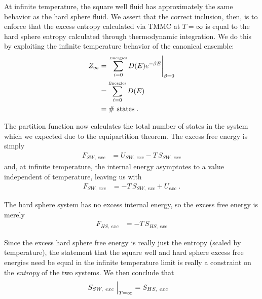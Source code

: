 \documentclass[12pt]{article}
\begin{document}
At infinite temperature, the square well fluid has approximately the same behavior as the hard sphere fluid.  We assert that the correct inclusion, then, is to enforce that the excess entropy calculated via TMMC at $T=\infty$ is equal to the hard sphere entropy calculated through thermodynamic integration. We do this by exploiting the infinite temperature behavior of the canonical ensemble:
\begin{align}
    Z_{\infty} &= \left.\sum_{i=0}^{\text{\tiny Energies}} D(E) e^{-\beta E}\right|_{\beta = 0}\\
    &= \sum_{i=0}^{\text{\tiny Energies}} D(E)\\
    &= \#\text{~states}\;.
\end{align}

The partition function now calculates the total number of states in the system which we expected due to the equipartition theorem. The excess free energy is simply
\begin{align}
    F_{SW,~exc} &= U_{SW,~exc} - T\,S_{SW,~exc}     
\end{align} 
and, at infinite temperature, the internal energy asymptotes to a value independent of temperature, leaving us with
\begin{align}
    F_{SW,~exc} &= -T\,S_{SW, ~exc} + U_{exc}\;.
\end{align}

The hard sphere system has no excess internal energy, so the excess free energy is merely
\begin{align}
     F_{HS,~exc} &= -T\,S_{HS,~exc} 
\end{align} 

Since the excess hard sphere free energy is really just the entropy \cite{valeskethesis} (scaled by temperature), the statement that the square well and hard sphere excess free energies need be equal in the infinite temperature limit is really a constraint on the {\it entropy} of the two systems. We then conclude that
\begin{align}
    S_{SW,~exc} \Bigm\lvert_{T=\infty} &= S_{HS,~exc}
\end{align}
\end{document}
